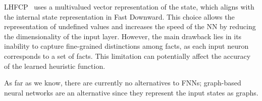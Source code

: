 LHFCP~\cite{Geissmann/2015} uses a multivalued \sas vector representation of the state, which aligns with the internal state representation in Fast Downward. This choice allows the representation of undefined values and increases the speed of the NN by reducing the dimensionality of the input layer. However, the main drawback lies in its inability to capture fine-grained distinctions among facts, as each input neuron corresponds to a set of facts. This limitation can potentially affect the accuracy of the learned heuristic function.

As far as we know, there are currently no alternatives to FNNs; graph-based neural networks \cite{Shen.etal/2020} are an alternative since they represent the input states as graphs.
